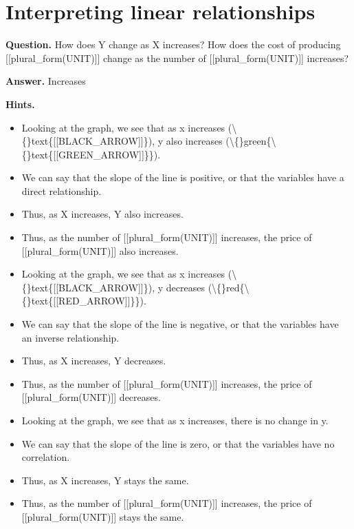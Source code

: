 \documentclass{article}
\begin{document}
\section*{Interpreting linear relationships}
\textbf{Question.} How does Y change as X increases?
                    How does the cost of producing [[plural\_form(UNIT)]] change as the number of [[plural\_form(UNIT)]] increases?

\textbf{Answer.} Increases

\textbf{Hints.}
\begin{itemize}
  \item Looking at the graph, we see that as x increases (\textbackslash\{\}text\{[[BLACK\_ARROW]]\}), y also increases (\textbackslash\{\}green\{\textbackslash\{\}text\{[[GREEN\_ARROW]]\}\}).
  \item We can say that the slope of the line is positive, or that the variables have a direct relationship.
  \item Thus, as X increases, Y also increases.
  \item Thus, as the number of [[plural\_form(UNIT)]] increases, the price of [[plural\_form(UNIT)]] also increases.
  \item Looking at the graph, we see that as x increases (\textbackslash\{\}text\{[[BLACK\_ARROW]]\}), y decreases (\textbackslash\{\}red\{\textbackslash\{\}text\{[[RED\_ARROW]]\}\}).
  \item We can say that the slope of the line is negative, or that the variables have an inverse relationship.
  \item Thus, as X increases, Y decreases.
  \item Thus, as the number of [[plural\_form(UNIT)]] increases, the price of [[plural\_form(UNIT)]] decreases.
  \item Looking at the graph, we see that as x increases, there is no change in y.
  \item We can say that the slope of the line is zero, or that the variables have no correlation.
  \item Thus, as X increases, Y stays the same.
  \item Thus, as the number of [[plural\_form(UNIT)]] increases, the price of [[plural\_form(UNIT)]] stays the same.
\end{itemize}
\end{document}
